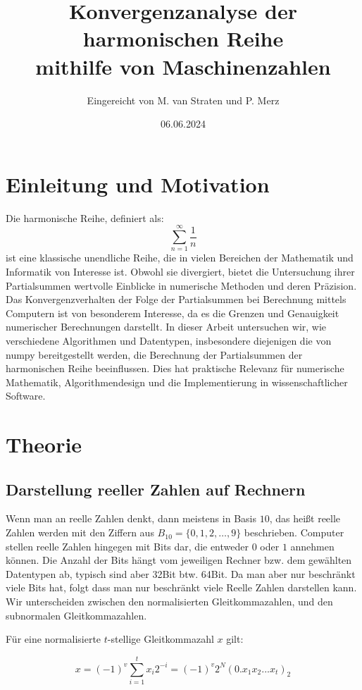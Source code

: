 \documentclass{scrartcl}
\title{Konvergenzanalyse der harmonischen Reihe\\
mithilfe von Maschinenzahlen}
\author{
  Eingereicht von M. van Straten und P. Merz
}
\date{06.06.2024}
\begin{document}
\maketitle
\cleardoublepage{}
\tableofcontents
\cleardoublepage{}

\section{Einleitung und Motivation}
Die harmonische Reihe, definiert als: \[ \sum_{n=1}^{\infty} \frac{1}{n} \] ist
eine klassische unendliche Reihe, die in vielen Bereichen der Mathematik und
Informatik von Interesse ist.
Obwohl sie divergiert, bietet die Untersuchung ihrer Partialsummen wertvolle
Einblicke in numerische Methoden und deren Präzision.
Das Konvergenzverhalten der Folge der Partialsummen bei Berechnung mittels
Computern ist von besonderem Interesse, da es die Grenzen und Genauigkeit
numerischer Berechnungen darstellt.
In dieser Arbeit untersuchen wir, wie verschiedene Algorithmen und Datentypen,
insbesondere diejenigen die von numpy bereitgestellt werden, die Berechnung der
Partialsummen der harmonischen Reihe beeinflussen.
Dies hat praktische Relevanz für numerische Mathematik, Algorithmendesign und
die Implementierung in wissenschaftlicher Software.

\section{Theorie}
\subsection{Darstellung reeller Zahlen auf Rechnern}
Wenn man an reelle Zahlen denkt, dann meistens in Basis \(10\), das heißt
reelle Zahlen werden mit den Ziffern aus \(B_{10} = \{0, 1, 2, \dots, 9\} \)
beschrieben.
Computer stellen reelle Zahlen hingegen mit Bits dar, die entweder \(0\) oder
\(1\) annehmen können.
Die Anzahl der Bits hängt vom jeweiligen Rechner bzw.
dem gewählten Datentypen ab, typisch sind aber 32Bit btw. 64Bit.
Da man aber nur beschränkt viele Bits hat, folgt dass man nur beschränkt viele
Reelle Zahlen darstellen kann.
Wir unterscheiden zwischen den normalisierten Gleitkommazahlen, und den
subnormalen Gleitkommazahlen.
\begin{flushleft}
    Für eine normalisierte \(t\)-stellige Gleitkommazahl \(x\) gilt:
\end{flushleft} \[ x = (-1)^{v}\sum_{i=1}^{t} x_i 2^{-i} = (-1)^v 2^N (0.x_1x_2
    .
    .. x_t)_2 \]
\end{document}
